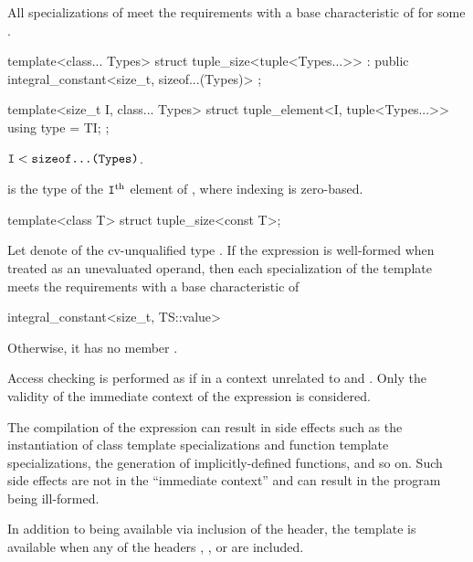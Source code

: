 \begin{itemdescr}
\pnum
All specializations of  meet the
 requirements with a
base characteristic of 
for some .
\end{itemdescr}

%
\begin{itemdecl}
template<class... Types>
  struct tuple_size<tuple<Types...>> : public integral_constant<size_t, sizeof...(Types)> { };
\end{itemdecl}

%
\begin{itemdecl}
template<size_t I, class... Types>
  struct tuple_element<I, tuple<Types...>> {
    using type = TI;
  };
\end{itemdecl}

\begin{itemdescr}
\pnum
\mandates
$\texttt{I} < \texttt{sizeof...(Types)}$.

\pnum
\ctype
{} is the
type of the $\texttt{I}^\text{th}$ element of ,
where indexing is zero-based.
\end{itemdescr}

%
\begin{itemdecl}
template<class T> struct tuple_size<const T>;
\end{itemdecl}

\begin{itemdescr}
\pnum
Let  denote  of the cv-unqualified type .
If the expression  is well-formed
when treated as an unevaluated operand, then
each specialization of the template meets the  requirements
with a base characteristic of
\begin{codeblock}
integral_constant<size_t, TS::value>
\end{codeblock}
Otherwise, it has no member .

\pnum
Access checking is performed as if in a context
unrelated to  and .
Only the validity of the immediate context of the expression is considered.
\begin{note}
The compilation of the expression can result in side effects
such as the instantiation of class template specializations and
function template specializations, the generation of implicitly-defined functions, and so on.
Such side effects are not in the ``immediate context'' and
can result in the program being ill-formed.
\end{note}

\pnum
In addition to being available via inclusion of the  header,
the template is available
when any of the headers
,
, or
are included.
\end{itemdescr}

